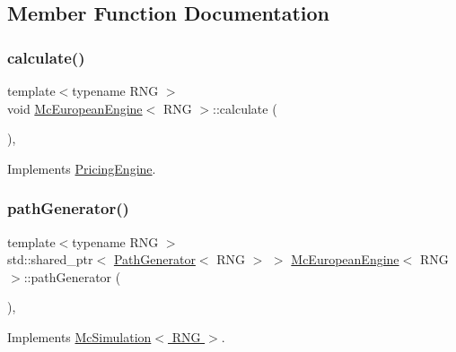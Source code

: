 \subsection{Member Function Documentation}
\hypertarget{class_mc_european_engine_a6c29ef7a7ba6cd1a2f93ee63070cf40e}{}\label{class_mc_european_engine_a6c29ef7a7ba6cd1a2f93ee63070cf40e} 
\subsubsection{\texorpdfstring{calculate()}{calculate()}}
{\footnotesize\ttfamily template$<$typename R\+NG $>$ \\
void \hyperlink{class_mc_european_engine}{Mc\+European\+Engine}$<$ R\+NG $>$\+::calculate (\begin{DoxyParamCaption}{ }\end{DoxyParamCaption})\hspace{0.3cm}{\ttfamily [override]}, {\ttfamily [virtual]}}



Implements \hyperlink{class_pricing_engine_a733511ffc3cf5e4dc1fbc2a39208d8bd}{Pricing\+Engine}.

\hypertarget{class_mc_european_engine_af3bd77fe30b60833448ee44efe6280d9}{}\label{class_mc_european_engine_af3bd77fe30b60833448ee44efe6280d9} 
\subsubsection{\texorpdfstring{path\+Generator()}{pathGenerator()}}
{\footnotesize\ttfamily template$<$typename R\+NG $>$ \\
std\+::shared\+\_\+ptr$<$ \hyperlink{class_path_generator}{Path\+Generator}$<$ R\+NG $>$ $>$ \hyperlink{class_mc_european_engine}{Mc\+European\+Engine}$<$ R\+NG $>$\+::path\+Generator (\begin{DoxyParamCaption}{ }\end{DoxyParamCaption})\hspace{0.3cm}{\ttfamily [override]}, {\ttfamily [virtual]}}



Implements \hyperlink{class_mc_simulation_a44086a1efd452d8644c9f2e52417038f}{Mc\+Simulation$<$ R\+N\+G $>$}.

